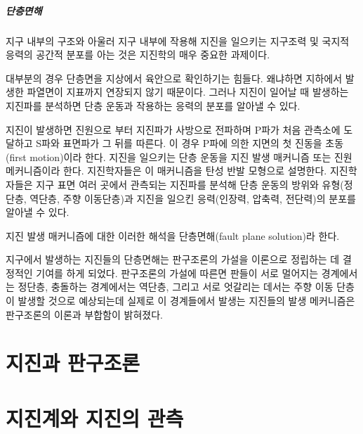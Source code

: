 \documentclass[12pt, a4paper, oneside]{book}
\begin{document}
		
		
		
		\paragraph{단층면해}

		지구 내부의 구조와 아울러 지구 내부에 작용해 지진을 일으키는 지구조력 및 국지적 응력의 공간적 분포를 
		아는 것은 지진학의 매우 중요한 과제이다.
		
		대부분의 경우 단층면을 지상에서 육안으로 확인하기는 힘들다.
		왜냐하면 지하에서 발생한 파열면이 지표까지 연장되지 않기 때문이다. 
		그러나 지진이 일어날 때 발생하는 지진파를 분석하면 단층 운동과 작용하는 응력의 분포를 알아낼 수 있다.
		
		지진이 발생하면 진원으로 부터 지진파가 사방으로 전파하며 P파가 처음 관측소에 도달하고 S파와 표면파가 그 뒤를 따른다.
		이 경우 P파에 의한 지면의 첫 진동을 초동(first motion)이라 한다.
		 지진을 일으키는 단층 운동을 지진 발생 매커니즘 또는 진원 메커니즘이라 한다.
		 지진학자들은 이 매커니즘을 탄성 반발 모형으로 설명한다.
		 지진학자들은 지구 표면 여러 곳에서 관측되는 지진파를 분석해 단층 운동의 방위와 유형(정단층, 역단층, 주향 이동단층)과 지진을 일으킨 응력(인장력, 압축력, 전단력)의 분포를 알아낼 수 있다. 
		 
		 
		 지진 발생 매커니즘에 대한 이러한 해석을 단층면해(fault plane solution)라 한다.
		 
		지구에서 발생하는 지진들의 단층면해는 판구조론의 가설을 이론으로 정립하는 데 결정적인 기여를 하게 되었다.
		판구조론의 가설에 따른면 판들이 서로 멀어지는 경계에서는 정단층, 충돌하는 경계에서는 역단층, 그리고 서로 엇갈리는 데서는 주향 이동 단층이 발생할 것으로 예상되는데 실제로 이 경계들에서 발생는 지진들의 발생 메커니즘은 판구조론의 이론과 부합함이 밝혀졌다.
		
		
		



	\clearpage
	\chapter{지진과 판구조론}




	\clearpage
	\chapter{지진계와 지진의 관측}
\end{document}
